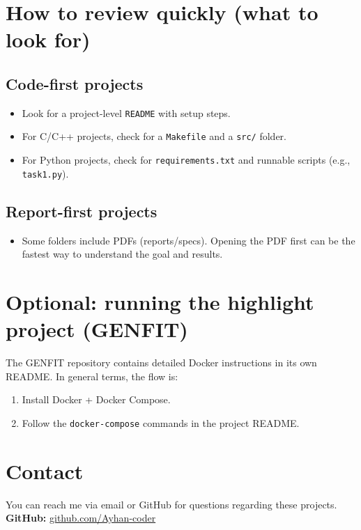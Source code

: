 \documentclass[11pt]{article}
\begin{document}
\section{How to review quickly (what to look for)}

\subsection{Code-first projects}
\begin{itemize}
    \item Look for a project-level \texttt{README} with setup steps.
    \item For C/C++ projects, check for a \texttt{Makefile} and a \texttt{src/} folder.
    \item For Python projects, check for \texttt{requirements.txt} and runnable scripts (e.g., \texttt{task1.py}).
\end{itemize}

\subsection{Report-first projects}
\begin{itemize}
    \item Some folders include PDFs (reports/specs). Opening the PDF first can be the fastest way to understand the goal and results.
\end{itemize}

\section{Optional: running the highlight project (GENFIT)}
The GENFIT repository contains detailed Docker instructions in its own README. In general terms, the flow is:
\begin{enumerate}
    \item Install Docker + Docker Compose.
    \item Follow the \texttt{docker-compose} commands in the project README.
\end{enumerate}

\section{Contact}
You can reach me via email or GitHub for questions regarding these projects.
\\ \textbf{GitHub:} \href{https://github.com/Ayhan-coder}{github.com/Ayhan-coder}
\end{document}
